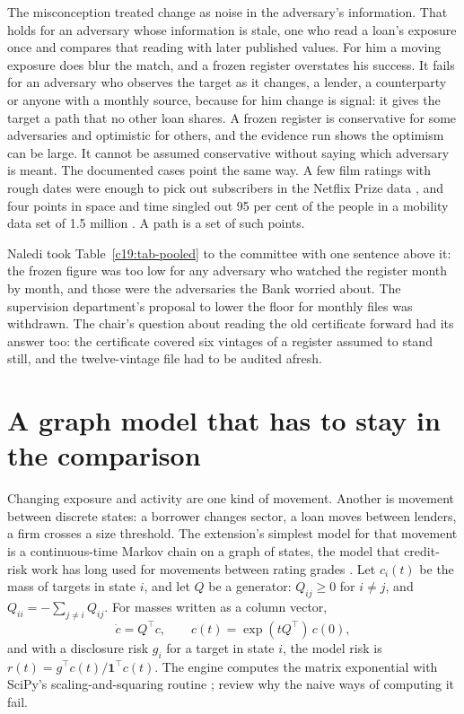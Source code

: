 The misconception treated change as noise in the adversary's information. That holds for
an adversary whose information is stale, one who read a loan's exposure once and compares
that reading with later published values. For him a moving exposure does blur the match,
and a frozen register overstates his success. It fails for an adversary who observes the target
as it changes, a lender, a counterparty or anyone with a monthly source, because for him
change is signal: it gives the target a path that no other loan shares. A frozen register is
conservative for some adversaries and optimistic for others, and the evidence run shows the
optimism can be large. It cannot be assumed conservative without saying which adversary
is meant. The documented cases point the same way. A few film ratings with rough dates
were enough to pick out subscribers in the Netflix Prize data \citep{narayanan2008}, and four points in space and time singled out 95 per cent of the people in a mobility
data set of 1.5 million \citep{demontjoye2013}. A path is a set of such points.

Naledi took Table~\ref{c19:tab-pooled} to the committee with one sentence above it: the frozen figure
was too low for any adversary who watched the register month by month, and those were
the adversaries the Bank worried about. The supervision department's proposal to lower the
floor for monthly files was withdrawn. The chair's question about reading the old certificate
forward had its answer too: the certificate covered six vintages of a register assumed to stand
still, and the twelve-vintage file had to be audited afresh.

\section{A graph model that has to stay in the comparison}

Changing exposure and activity are one kind of movement. Another is movement between
discrete states: a borrower changes sector, a loan moves between lenders, a firm crosses
a size threshold. The extension's simplest model for that movement is a continuous-time
Markov chain on a graph of states, the model that credit-risk work has long used for movements between rating grades \citep{jarrow1997,lando2002}. Let $c_i(t)$ be
the mass of targets in state $i$, and let $Q$ be a generator: $Q_{ij}\ge0$ for $i\ne j$, and $Q_{ii}=-\sum_{j\ne i}Q_{ij}$.
For masses written as a column vector,
\begin{equation}\label{c19:eq-graph}
\dot c=Q^\top c,\qquad c(t)=\exp(tQ^\top)\,c(0),
\end{equation}
and with a disclosure risk $g_i$ for a target in state $i$, the model risk is $r(t)=g^\top c(t)/\mathbf 1^\top c(t)$.
The engine computes the matrix exponential with SciPy's scaling-and-squaring routine \citep{almohy2009}; \citet{moler2003} review why the naive ways of computing it fail.

